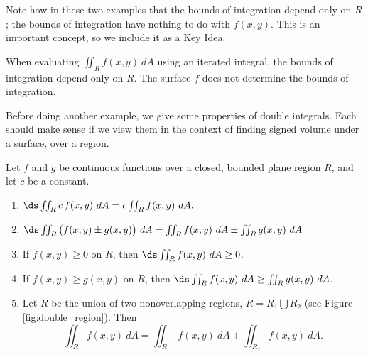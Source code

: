 Note how in these two examples that the bounds of integration depend only on $R$; the bounds of integration have nothing to do with $f(x,y)$. This is an important concept, so we include it  as a Key Idea.

{When evaluating $\iint_Rf(x,y)\ dA$ using an iterated integral, the bounds of integration depend only on $R$. The surface $f$ does not determine the bounds of integration.
}

Before doing another example, we give some properties of double integrals. Each should make sense if we view them in the context of finding signed volume under a surface, over a region.

{Let $f$ and $g$ be continuous functions over a closed, bounded plane region $R$, and let $c$ be a constant.
\begin{enumerate}
	\item $\ds \iint_Rc\,f(x,y)\ dA = c\iint_Rf(x,y)\ dA.$
	\item	$\ds \iint_R \big(f(x,y)\pm g(x,y)\big)\ dA = \iint_R f(x,y)\ dA \pm \iint_R g(x,y)\ dA $
	\item	If $f(x,y)\geq 0$ on $R$, then $\ds \iint_R f(x,y)\ dA\geq 0$.
	\item	If $f(x,y)\geq g(x,y)$ on $R$, then $\ds \iint_R f(x,y)\ dA\geq \iint_R g(x,y)\ dA$.
	\item \label{thm:double_prop_regions}	Let $R$ be the union of two nonoverlapping regions, $R = R_1\bigcup R_2$ (see Figure \ref{fig:double_region}). Then 
	$$\iint_R f(x,y)\ dA = \iint_{R_1}f(x,y)\ dA+ \iint_{R_2}f(x,y)\ dA.$$
\end{enumerate}
}

